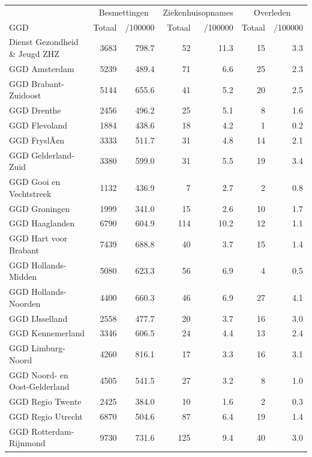 \documentclass[
  english,
  man,floatsintext]{apa6}
\begin{document}
\begin{table}
\centering\begingroup\fontsize{10}{12}\selectfont

\begin{threeparttable}
\begin{tabular}{lrrrrrr}
\toprule
\multicolumn{1}{c}{ } & \multicolumn{2}{c}{Besmettingen} & \multicolumn{2}{c}{Ziekenhuisopnames} & \multicolumn{2}{c}{Overleden} \\
\cmidrule(l{3pt}r{3pt}){2-3} \cmidrule(l{3pt}r{3pt}){4-5} \cmidrule(l{3pt}r{3pt}){6-7}
GGD & Totaal & /100000 & Totaal & /100000 & Totaal & /100000\\
\midrule
Dienst Gezondheid \& Jeugd ZHZ & 3683 & 798.7 & 52 & 11.3 & 15 & 3.3\\
GGD Amsterdam & 5239 & 489.4 & 71 & 6.6 & 25 & 2.3\\
GGD Brabant-Zuidoost & 5144 & 655.6 & 41 & 5.2 & 20 & 2.5\\
GGD Drenthe & 2456 & 496.2 & 25 & 5.1 & 8 & 1.6\\
GGD Flevoland & 1884 & 438.6 & 18 & 4.2 & 1 & 0.2\\
GGD FryslÃ¢n & 3333 & 511.7 & 31 & 4.8 & 14 & 2.1\\
GGD Gelderland-Zuid & 3380 & 599.0 & 31 & 5.5 & 19 & 3.4\\
GGD Gooi en Vechtstreek & 1132 & 436.9 & 7 & 2.7 & 2 & 0.8\\
GGD Groningen & 1999 & 341.0 & 15 & 2.6 & 10 & 1.7\\
GGD Haaglanden & 6790 & 604.9 & 114 & 10.2 & 12 & 1.1\\
GGD Hart voor Brabant & 7439 & 688.8 & 40 & 3.7 & 15 & 1.4\\
GGD Hollands-Midden & 5080 & 623.3 & 56 & 6.9 & 4 & 0.5\\
GGD Hollands-Noorden & 4400 & 660.3 & 46 & 6.9 & 27 & 4.1\\
GGD IJsselland & 2558 & 477.7 & 20 & 3.7 & 16 & 3.0\\
GGD Kennemerland & 3346 & 606.5 & 24 & 4.4 & 13 & 2.4\\
GGD Limburg-Noord & 4260 & 816.1 & 17 & 3.3 & 16 & 3.1\\
GGD Noord- en Oost-Gelderland & 4505 & 541.5 & 27 & 3.2 & 8 & 1.0\\
GGD Regio Twente & 2425 & 384.0 & 10 & 1.6 & 2 & 0.3\\
GGD Regio Utrecht & 6870 & 504.6 & 87 & 6.4 & 19 & 1.4\\
GGD Rotterdam-Rijnmond & 9730 & 731.6 & 125 & 9.4 & 40 & 3.0\\

\end{tabular}
\end{threeparttable}
\end{table}
\end{document}
